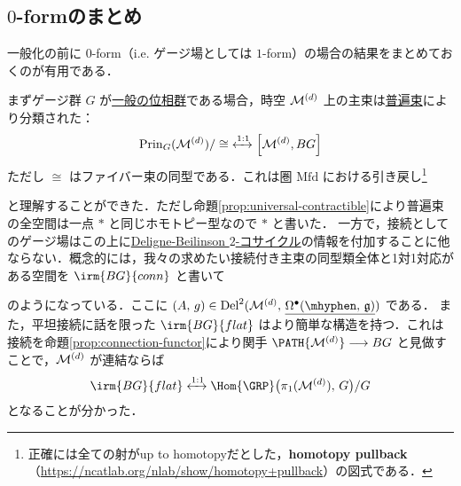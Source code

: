 \documentclass[TQFT_main]{subfiles}
\begin{document}
\subsection{$0$-formのまとめ}

一般化の前に $0$-form（i.e. ゲージ場としては $1$-form）の場合の結果をまとめておくのが有用である．

まずゲージ群 $G$ が\underline{一般の位相群}である場合，時空 $\mathcal{M}^{(d)}$ 上の主束は\hyperref[def:universal-bundle]{普遍束}により分類された：
\begin{align}
    \label{eq:1form-univ}
    \mathrm{Prin}_G (\mfdcal{M}{d})/\cong\; \xleftrightarrow{1:1} \comm{\mfdcal{M}{d}}{BG}
\end{align}
ただし $\cong$ はファイバー束の同型である．これは圏 $\bm{\mathrm{Mfd}}$ における引き戻し\footnote{正確には全ての射がup to homotopyだとした，\textbf{homotopy pullback}（\url{https://ncatlab.org/nlab/show/homotopy+pullback}）の図式である．}
\begin{center}
\end{center}
と理解することができた．ただし命題\ref{prop:universal-contractible}により普遍束の全空間は一点 $*$ と同じホモトピー型なので $*$ と書いた．
一方で，接続としてのゲージ場はこの上に\hyperref[def:Deligne-Beilinson]{Deligne-Beilinson $2$-コサイクル}の情報を付加することに他ならない．概念的には，我々の求めたい接続付き主束の同型類全体と1対1対応がある空間を $\irm{BG}{conn}$ と書いて
\begin{center}
\end{center}
のようになっている．ここに $(A,\, g) \in \mathrm{Del}^2(\mfdcal{M}{d},\, \underline{\Omega^\bullet(\mhyphen,\, \mathfrak{g})})$ である．
また，平坦接続に話を限った $\irm{BG}{flat}$ はより簡単な構造を持つ．これは接続を命題\ref{prop:connection-functor}により関手 $\PATH{\mfdcal{M}{d}} \lto BG$ と見做すことで，$\mathcal{M}^{(d)}$ が連結ならば
\begin{align}
    \label{eq:1form-flat}
    \irm{BG}{flat} \xleftrightarrow{1:1} \Hom{\GRP} \bigl( \pi_1(\mfdcal{M}{d}),\, G \bigr) /G
\end{align}
となることが分かった．
\end{document}
